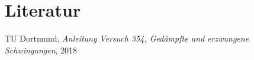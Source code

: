 \section{Literatur}

\cite{1} TU Dortmund, \textit{Anleitung Versuch 354, Gedämpfte und erzwungene Schwingungen}, 2018